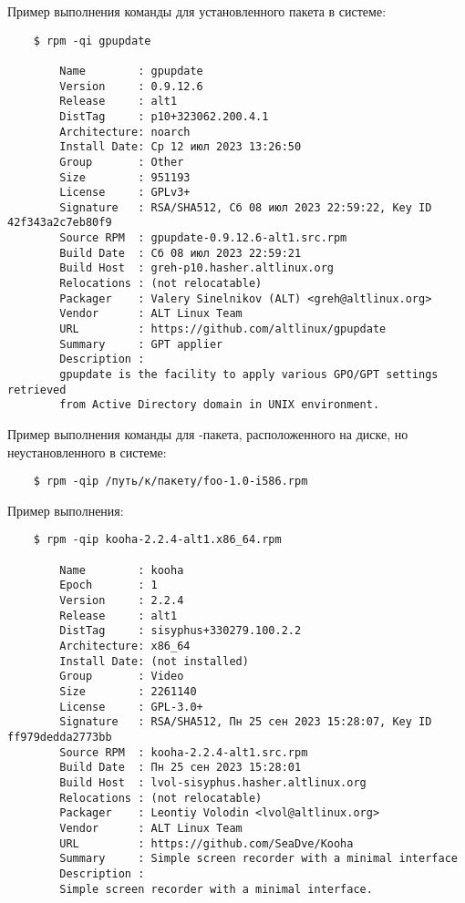 
Пример выполнения команды для установленного пакета в системе:
\begin{verbatim}
    $ rpm -qi gpupdate

        Name        : gpupdate
        Version     : 0.9.12.6
        Release     : alt1
        DistTag     : p10+323062.200.4.1
        Architecture: noarch
        Install Date: Ср 12 июл 2023 13:26:50
        Group       : Other
        Size        : 951193
        License     : GPLv3+
        Signature   : RSA/SHA512, Сб 08 июл 2023 22:59:22, Key ID 42f343a2c7eb80f9
        Source RPM  : gpupdate-0.9.12.6-alt1.src.rpm
        Build Date  : Сб 08 июл 2023 22:59:21
        Build Host  : greh-p10.hasher.altlinux.org
        Relocations : (not relocatable)
        Packager    : Valery Sinelnikov (ALT) <greh@altlinux.org>
        Vendor      : ALT Linux Team
        URL         : https://github.com/altlinux/gpupdate
        Summary     : GPT applier
        Description :
        gpupdate is the facility to apply various GPO/GPT settings retrieved
        from Active Directory domain in UNIX environment.
\end{verbatim}

Пример выполнения команды для -пакета, расположенного на диске, но неустановленного в системе:
\begin{verbatim}
    $ rpm -qip /путь/к/пакету/foo-1.0-i586.rpm
\end{verbatim}

Пример выполнения:
\begin{verbatim}
    $ rpm -qip kooha-2.2.4-alt1.x86_64.rpm

        Name        : kooha
        Epoch       : 1
        Version     : 2.2.4
        Release     : alt1
        DistTag     : sisyphus+330279.100.2.2
        Architecture: x86_64
        Install Date: (not installed)
        Group       : Video
        Size        : 2261140
        License     : GPL-3.0+
        Signature   : RSA/SHA512, Пн 25 сен 2023 15:28:07, Key ID ff979dedda2773bb
        Source RPM  : kooha-2.2.4-alt1.src.rpm
        Build Date  : Пн 25 сен 2023 15:28:01
        Build Host  : lvol-sisyphus.hasher.altlinux.org
        Relocations : (not relocatable)
        Packager    : Leontiy Volodin <lvol@altlinux.org>
        Vendor      : ALT Linux Team
        URL         : https://github.com/SeaDve/Kooha
        Summary     : Simple screen recorder with a minimal interface
        Description :
        Simple screen recorder with a minimal interface.
\end{verbatim}

